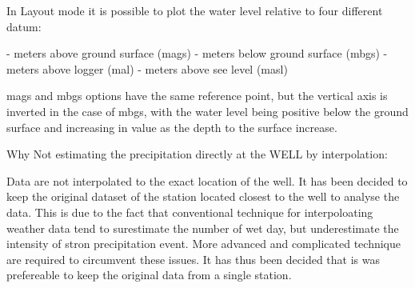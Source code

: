 \documentclass[WHATMANUAL.tex]{subfiles}
\begin{document}
In Layout mode it is possible to plot the water level relative to four different datum:

- meters above ground surface (mags)
- meters below ground surface (mbgs)
- meters above logger (mal)
- meters above see level (masl)

mags and mbgs options have the same reference point, but the vertical axis is inverted in the case of mbgs, with the water level being positive below the ground surface and increasing in value as the depth to the surface increase.

Why Not estimating the precipitation directly at the WELL by interpolation:

Data are not interpolated to the exact location of the well. It has been decided to keep the original dataset of the station located closest to the well to analyse the data. This is due to the fact that conventional technique for interpoloating weather data tend to surestimate the number of wet day, but underestimate the intensity of stron precipitation event. More advanced and complicated technique are required to circumvent these issues. It has thus been decided that is was prefereable to keep the original data from a single station.
\end{document}
